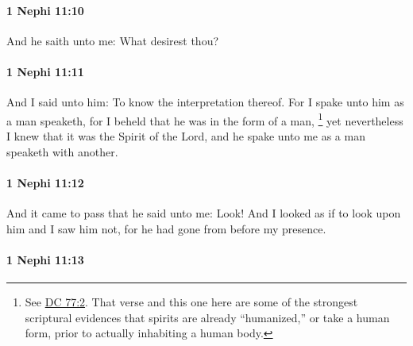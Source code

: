 		\paragraph{1 Nephi 11:10} %
			\label{1NEPHI-11-10}

			And he saith unto me:
			What desirest thou?

		\paragraph{1 Nephi 11:11} %
			\label{1NEPHI-11-11}

			And I said unto him:
			To know the interpretation thereof.
			For I spake unto him as a man speaketh,
			for I beheld that he was in the form of a man,%
				\footnote{%
					See \hyperref[DC77-2]{DC 77:2}. That verse and this one here are some of the strongest scriptural evidences that spirits are already ``humanized,'' or take a human form, prior to actually inhabiting a human body.
					}
			yet nevertheless I knew that it was the Spirit of the Lord,
			and he spake unto me as a man speaketh with another.

		\paragraph{1 Nephi 11:12} %
			\label{1NEPHI-11-12}

			And it came to pass that he said unto me: Look!
			And I looked as if to look upon him and I saw him not,
			for he had gone from before my presence.

		\paragraph{1 Nephi 11:13} %
			\label{1NEPHI-11-13}

